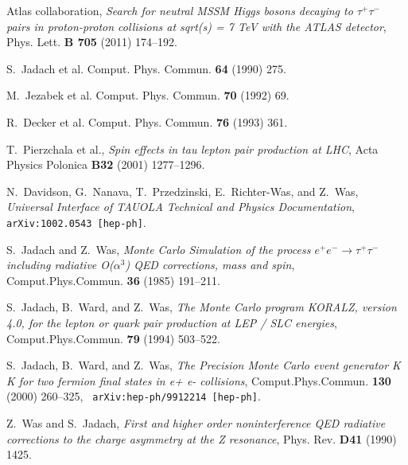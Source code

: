 \documentclass[12pt]{article}
\begin{document}
\providecommand{\href}[2]{#2}\begingroup\raggedright\begin{thebibliography}{10}

{Atlas collaboration}, {\em {Search for neutral MSSM Higgs bosons decaying to
  $\tau^{+}\tau^{-}$ pairs in proton-proton collisions at sqrt(s) = 7 TeV with
  the ATLAS detector}\/},  Phys. Lett. {\bf B 705} (2011)  174--192.

S.~Jadach et al.
Comput. Phys. Commun. {\bf 64} (1990)  275.

M.~Jezabek et al.
Comput. Phys. Commun. {\bf 70} (1992)  69.

R.~Decker et al.
Comput. Phys. Commun. {\bf 76} (1993)  361.

T.~Pierzchala et al., {\em {Spin effects in tau lepton pair production at
  LHC}\/},
Acta Physics Polonica {\bf B32} (2001)  1277--1296.

N.~Davidson, G.~Nanava, T.~Przedzinski, E.~Richter-Was, and Z.~Was, {\em
  {Universal Interface of TAUOLA Technical and Physics Documentation}\/},
  \href{http://arxiv.org/abs/1002.0543}{{\tt arXiv:1002.0543 [hep-ph]}}.

S.~Jadach and Z.~Was, {\em {Monte Carlo Simulation of the process
  $e^{+}e^{-}\rightarrow \tau^{+}\tau^{-}$ including radiative O($\alpha^{3}$)
  QED corrections, mass and spin}\/},
  \href{http://dx.doi.org/10.1016/0010-4655(85)90123-7}{Comput.Phys.Commun.
  {\bf 36} (1985)  191--211}.

S.~Jadach, B.~Ward, and Z.~Was, {\em {The Monte Carlo program KORALZ, version
  4.0, for the lepton or quark pair production at LEP / SLC energies}\/},
  \href{http://dx.doi.org/10.1016/0010-4655(94)90190-2}{Comput.Phys.Commun.
  {\bf 79} (1994)  503--522}.

S.~Jadach, B.~Ward, and Z.~Was, {\em {The Precision Monte Carlo event generator
  K K for two fermion final states in e+ e- collisions}\/},
  \href{http://dx.doi.org/10.1016/S0010-4655(00)00048-5}{Comput.Phys.Commun.
  {\bf 130} (2000)  260--325}, \href{http://arxiv.org/abs/hep-ph/9912214}{{\tt
  arXiv:hep-ph/9912214 [hep-ph]}}.

Z.~Was and S.~Jadach, {\em {First and higher order noninterference QED
  radiative corrections to the charge asymmetry at the Z resonance}\/},
\href{http://dx.doi.org/10.1103/PhysRevD.41.1425}{Phys. Rev. {\bf D41} (1990)
  1425}.


\end{thebibliography}
\end{document}
